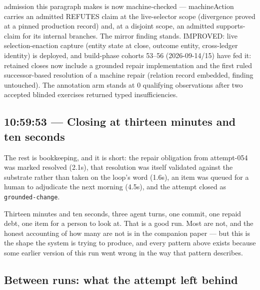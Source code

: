 {admission this paragraph makes is now machine-checked --- machineAction
carries an admitted REFUTES claim at the live-selector scope (divergence
proved at a pinned production record) and, at a disjoint scope, an
admitted supports-claim for its internal branches. The mirror finding
stands. IMPROVED: live selection-enaction capture (entity state at close,
outcome entity, cross-ledger identity) is deployed, and build-phase
cohorts 53--56 (2026-09-14/15) have fed it: retained closes now include a
grounded repair implementation and the first ruled successor-based
resolution of a machine repair (relation record embedded, finding
untouched). The annotation arm stands at 0 qualifying observations after
two accepted blinded exercises returned typed insufficiencies.}

\subsection*{10:59:53 --- Closing at thirteen minutes and ten seconds}

The rest is bookkeeping, and it is short: the repair obligation from
attempt-054 was marked resolved (2.1s), that resolution was itself validated
against the substrate rather than taken on the loop's word (1.6s), an item was
queued for a human to adjudicate the next morning (4.5s), and the attempt closed
as \texttt{grounded-change}.

Thirteen minutes and ten seconds, three agent turns, one commit, one repaid debt, one item for a
person to look at.  That is a good run.  Most are not, and the honest accounting
of how many are not is in the companion paper --- but this is the shape the
system is trying to produce, and every pattern above exists because some earlier
version of this run went wrong in the way that pattern describes.

\subsection*{Between runs: what the attempt left behind}

